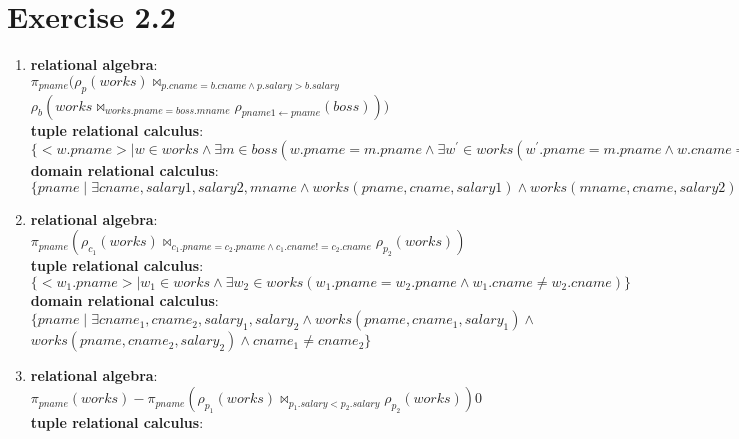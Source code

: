 \documentclass[12pt]{article}
\begin{document}
	\section{Exercise 2.2}
	\begin{enumerate}[label = 2.2.\arabic*]
		\item %
			\textbf{relational algebra}: \\
			$\pi_{pname}( \rho_{p}(works) \bowtie_{p.cname = b.cname \land p.salary > b.salary}$ \\
			\hspace*{2cm}$ \rho_{b}(works \bowtie_{works.pname = boss.mname} \rho_{pname1\leftarrow pname}(boss) ) )$ \\
			\textbf{tuple relational calculus}:\\
			$\{ <w.pname> \mid w \in works \land \exists m \in boss (w.pname = m.pname \land \exists w^\prime \in works ( w^\prime.pname =m.pname \land w.cname = w^\prime.cname \land w.salary > w^\prime.salary ))  \}$ \\
			\textbf{domain relational calculus}: \\
			$\{ pname \mid \exists cname, salary1, salary2,mname \land works(pname,cname,salary1) \land works(mname, cname, salary2) \land boss(pname, cname) \land salary1 > salary2\}$
		\item 
			\textbf{relational algebra}:\\
			$\pi_{pname}( \rho_{c_1}(works) \bowtie_{c_1.pname=c_2.pname \land c_1.cname != c_2.cname} \rho_{p_2}(works) )$ \\
			\textbf{tuple relational calculus}:\\
			$\{ <w_1.pname> \mid w_1\in works \land \exists w_2 \in works( w_1.pname=w_2.pname \land w_1.cname \neq w_2.cname) \} $ \\
			\textbf{domain relational calculus}:\\
			$\{ pname \mid \exists cname_1, cname_2, salary_1, salary_2 \land works(pname, cname_1, salary_1) \land$ \\
			\hspace*{2cm}$ works(pname, cname_2, salary_2) \land cname_1 \neq cname_2 \} $ \\
		\item 
			\textbf{relational algebra}:\\
			$\pi_{pname}(works) - \pi_{pname}(\rho_{p_1}(works) \bowtie_{p_1.salary < p_2.salary} \rho_{p_2}(works))0$ \\
			\textbf{tuple relational calculus}:\\

\end{enumerate}
\end{document}
